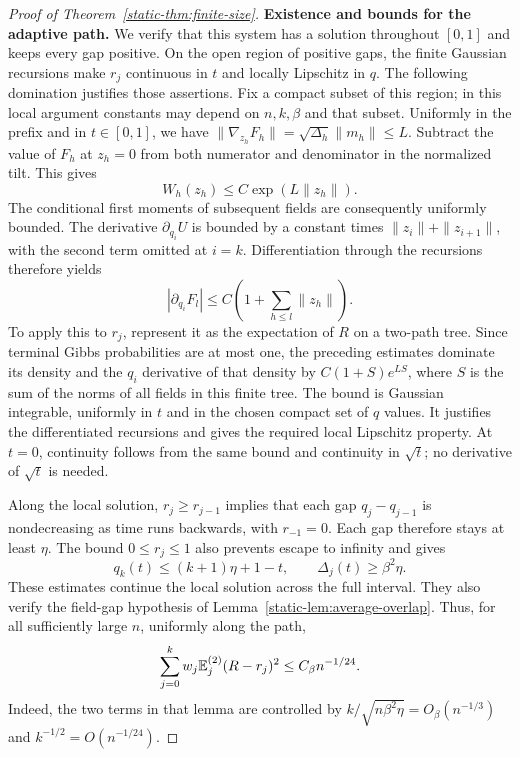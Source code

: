 \begin{proof}[Proof of Theorem~\ref{static-thm:finite-size}]
\par\medskip\noindent\textbf{Existence and bounds for the adaptive path.}\enspace
We verify that this system has a solution throughout $[0,1]$ and
keeps every gap positive. On the open region of positive gaps, the
finite Gaussian recursions make $r_j$ continuous in $t$ and locally
Lipschitz in $q$. The following domination justifies those assertions.
Fix a compact subset of this region; in this local argument constants
may depend on $n,k,\beta$ and that subset. Uniformly in the prefix and
in $t\in[0,1]$, we have
$\|\nabla_{z_h}F_h\|=\sqrt{\Delta_h}\|m_h\|\le L$.
Subtract the value of $F_h$ at $z_h=0$ from both numerator and
denominator in the normalized tilt. This gives
\[
 W_h(z_h)\le C\exp(L\|z_h\|).
\]
The conditional first moments of subsequent fields are consequently
uniformly bounded. The derivative $\partial_{q_i}U$ is bounded by a
constant times $\|z_i\|+\|z_{i+1}\|$, with the second term omitted
at $i=k$. Differentiation through the recursions therefore yields
\[
 |\partial_{q_i}F_l|\le C\left(1+\sum_{h\le l}\|z_h\|\right).
\]
To apply this to $r_j$, represent it as the expectation of $R$ on
a two-path tree. Since terminal Gibbs probabilities are at most one,
the preceding estimates dominate its density and the $q_i$ derivative
of that density by $C(1+S)e^{LS}$, where $S$ is the sum of the norms
of all fields in this finite tree. The bound is Gaussian integrable,
uniformly in $t$ and in the chosen compact set of $q$ values. It
justifies the differentiated recursions and gives the required local
Lipschitz property. At $t=0$, continuity follows from the same bound
and continuity in $\sqrt t$; no derivative of $\sqrt t$ is needed.

Along the local solution, $r_j\ge r_{j-1}$ implies that each gap
$q_j-q_{j-1}$ is nondecreasing as time runs backwards, with
$r_{-1}=0$. Each gap therefore stays at least $\eta$. The bound
$0\le r_j\le1$ also prevents escape to infinity and gives
\begin{equation}\label{static-eq:adaptive-path-bounds}
 q_k(t)\le(k+1)\eta+1-t,
 \qquad\Delta_j(t)\ge\beta^2\eta.
\end{equation}
These estimates continue the local solution across the full interval.
They also verify the field-gap hypothesis of
Lemma~\ref{static-lem:average-overlap}. Thus, for all sufficiently
large $n$, uniformly along the path,
\begin{equation}\label{static-eq:adaptive-overlap-error}
 \sum_{j=0}^kw_j\mathbb E_j^{(2)}(R-r_j)^2
 \le C_\beta n^{-1/24}.
\end{equation}
Indeed, the two terms in that lemma are controlled by
$k/\sqrt{n\beta^2\eta}=O_\beta(n^{-1/3})$ and
$k^{-1/2}=O(n^{-1/24})$.


\end{proof}
